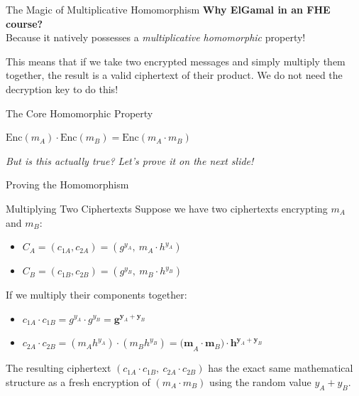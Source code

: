 \documentclass[aspectratio=169, 10pt]{beamer}
\begin{document}
\begin{frame}{The Magic of Multiplicative Homomorphism}
    \textbf{Why ElGamal in an FHE course?} \\
    Because it natively possesses a \textit{multiplicative homomorphic} property!
    
    \vspace{0.6cm}
    This means that if we take two encrypted messages and simply multiply them together, the result is a valid ciphertext of their product. We do not need the decryption key to do this!
    
    \vspace{0.6cm}
    \begin{alertblock}{The Core Homomorphic Property}
        \begin{center}
            \Large $\text{Enc}(m_A) \cdot \text{Enc}(m_B) = \text{Enc}(m_A \cdot m_B)$
        \end{center}
    \end{alertblock}
    
    \vspace{0.6cm}
    \begin{center}
        \textit{But is this actually true? Let's prove it on the next slide!}
    \end{center}
\end{frame}

\begin{frame}{Proving the Homomorphism}
    \begin{exampleblock}{Multiplying Two Ciphertexts}
        \small
        Suppose we have two ciphertexts encrypting $m_A$ and $m_B$:
        \begin{itemize}
            \item $C_A = (c_{1A}, c_{2A}) = (g^{y_A}, \ m_A \cdot h^{y_A})$
            \item $C_B = (c_{1B}, c_{2B}) = (g^{y_B}, \ m_B \cdot h^{y_B})$
        \end{itemize}
        
        \vspace{0.2cm}
        If we multiply their components together:
        \begin{itemize}
            \item $c_{1A} \cdot c_{1B} = g^{y_A} \cdot g^{y_B} = \textbf{g}^{ \textbf{y}_A + \textbf{y}_B }$
            \item $c_{2A} \cdot c_{2B} = (m_A h^{y_A}) \cdot (m_B h^{y_B}) = \textbf{(m}_A \cdot \textbf{m}_B\textbf{)} \cdot \textbf{h}^{ \textbf{y}_A + \textbf{y}_B }$
        \end{itemize}
    \end{exampleblock}
    
    \vspace{0.2cm}
    The resulting ciphertext $(c_{1A} \cdot c_{1B}, \ c_{2A} \cdot c_{2B})$ has the exact same mathematical structure as a fresh encryption of $(m_A \cdot m_B)$ using the random value $y_A + y_B$.
\end{frame}
\end{document}
